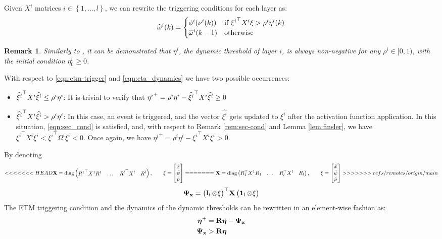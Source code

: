 \documentclass{ifacconf}
\theoremstyle{plain}
\newtheorem{remark}{Remark}
\begin{document}
Given $X^i$ matrices $i \in \left\{1, \dots, l \right\}$, we can rewrite the triggering conditions for each layer as:
\begin{equation}\label{eqn:etm-trigger}
  \widehat{\omega}^{i}(k) = \begin{cases}
    \phi^i(\nu^i(k)) & \text{if } {\xi^i}^\top X^i \xi > \rho^i \eta^i(k)\\
    \widehat{\omega}^{i}(k-1) & \text{otherwise}
  \end{cases}
\end{equation}
\begin{remark}\label{rem:eta-positive} \emph{Similarly to \citep[Lemma 3]{data-driven}, it can be demonstrated that $\eta^i$, the dynamic threshold of layer $i$, is always non-negative for any $\rho^i \in [0, 1)$, with the initial condition $\eta^i_0 \geq 0$.} \end{remark}
With respect to \eqref{eqn:etm-trigger} and \eqref{eqn:eta_dynamics} we have two possible occurrences:
\begin{itemize}
    \item $\widehat{{\xi^i}}^\top X^i \widehat{\xi^i} \leq \rho^i \eta^i$: It is trivial to verify that ${\eta^i}^+ = \rho^i \eta^i - \widehat{{\xi^i}}^\top X^i \widehat{\xi^i} \geq 0 $
    \item $\widehat{\xi^i}^\top X^i \widehat{\xi^i} > \rho^i \eta^i$: In this case, an event is triggered, and the vector $\widehat{\xi^i}$ gets updated to $\xi^i$ after the activation function application. In this situation, \eqref{eqn:sec_cond} is satisfied, and, with respect to Remark \ref{rem:sec-cond} and Lemma \ref{lem:finsler}, we have ${\xi^i}^\top X^i \xi^i < {\xi^i}^\top \Omega^i \xi^i < 0$. Once again, we have ${\eta^i}^+ = \rho^i \eta^i - {\xi^i}^\top X^i \xi^i > 0$.
\end{itemize}
By denoting 
\begin{equation}
<<<<<<< HEAD
    {\bf{X}} = \text{diag} \left(\begin{matrix}{R^1}^\top X^1 R^1 & \dots & {R^l}^\top X^l & R^l\end{matrix}\right), \qquad \xi = \left[\begin{matrix}\tilde{x} \\ \tilde{\psi} \\ \tilde{\nu}\end{matrix}\right]
=======
    {\bf{X}} = \text{diag} \left(\begin{matrix}R_1^\top X^1 R_1 & \dots & R_l^\top X^l & R_l\end{matrix}\right), \qquad \xi = \left[\begin{matrix}\tilde{x} \\ \tilde{\psi} \\ \tilde{\nu}\end{matrix}\right]
>>>>>>> refs/remotes/origin/main
\end{equation}
\begin{equation}\label{eqn:final-psi}
    \mathbf{\Psi_x} = \left(\begin{matrix}\operatorname{I}_l \otimes \xi\end{matrix}\right)^\top\! {\bf{X}} \left(\begin{matrix}\operatorname{\mathbf{1}}_l \otimes \xi\end{matrix}\right)
\end{equation}
The ETM triggering condition and the dynamics of the dynamic thresholds can be rewritten in an element-wise fashion as:
\begin{equation}
\begin{aligned}
    \boldsymbol{\eta}^+ &= {\bf{R}} \boldsymbol{\eta} - \mathbf{\Psi_x}\\
    \mathbf{\Psi_x} &> {\bf{R}} \boldsymbol{\eta}\end{aligned}
\end{equation}
\end{document}
